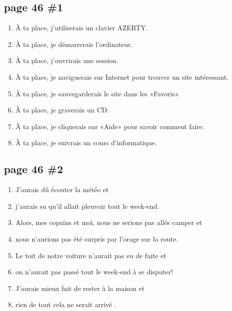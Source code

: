 \documentclass[letterpaper]{article}
\begin{document}
\doublespacing
\subsection*{page 46 \#1}
\begin{enumerate}
\item
À ta place, j'utiliserais un clavier AZERTY.
\item
À ta place, je démarrerais l'ordinateur.
\item
À ta place, j'ouvrirais une session.
\item
À ta place, je naviguerais sur Internet pour trouver un site intéressant.
\item
À ta place, je sauvegarderais le site dans les «Favoris».
\item
À ta place, je graverais un CD.
\item
À ta place, je cliquerais sur «Aide» pour savoir comment faire.
\item
À ta place, je suivrais un cours d'informatique.
\end{enumerate}
\subsection*{page 46 \#2}
\begin{enumerate}
\item
J'aurais dû écouter la météo et
\item
j'aurais su qu'il allait pleuvoir tout le week-end.
\item
Alors, mes copains et moi, nous ne serions pas allés camper et
\item
nous n'aurions pas été surpris par l'orage sur la route.
\item
Le toit de notre voiture n'aurait pas eu de fuite et
\item
on n'aurait pas passé tout le week-end à se disputer!
\item
J'aurais mieux fait de rester à la maison et
\item
rien de tout cela ne serait arrivé .
\end{enumerate}
\end{document}
